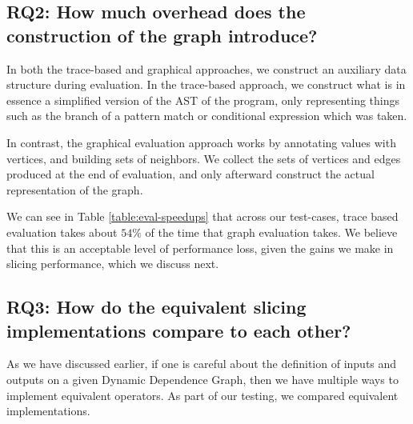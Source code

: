 {\tiny}

\subsection{RQ2: How much overhead does the construction of the graph introduce?}


In both the trace-based and graphical approaches, we construct an auxiliary data
structure during evaluation. In the trace-based approach, we construct what is
in essence a simplified version of the AST of the program, only representing
things such as the branch of a pattern match or conditional expression which
was taken. 

In contrast, the graphical evaluation approach works by annotating values with
vertices, and building sets of neighbors. We collect the sets of vertices and
edges produced at the end of evaluation, and only afterward construct the actual
representation of the graph. 

We can see in Table \ref{table:eval-speedups} that across our test-cases, trace
based evaluation takes about $54\%$ of the time that graph evaluation takes. We
believe that this is an acceptable level of performance loss, given the gains we 
make in slicing performance, which we discuss next. 
{\tiny}

\subsection{RQ3: How do the equivalent slicing implementations compare to each other?}
As we have discussed earlier, if one is careful about the definition of inputs
and outputs on a given Dynamic Dependence Graph, then we have multiple ways to
implement equivalent operators. As part of our testing, we compared equivalent
implementations.

